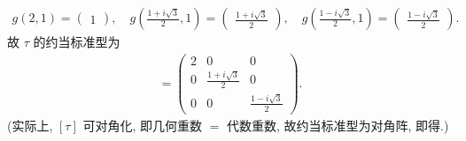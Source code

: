 \documentclass{assignment}
\begin{document}
\begin{sol}
\begin{itemize}
        \begin{align}
            g(2,1)=\begin{pmatrix}
                1
            \end{pmatrix},\quad g\left(\frac{1+i\sqrt{3}}{2},1\right)=\begin{pmatrix}
                \frac{1+i\sqrt{3}}{2}
            \end{pmatrix},\quad g\left(\frac{1-i\sqrt{3}}{2},1\right)=\begin{pmatrix}
                \frac{1-i\sqrt{3}}{2}
            \end{pmatrix}.
        \end{align}
        故 $\tau$ 的约当标准型为
        \begin{align}
            [\tau]=\begin{pmatrix}
                2&0&0\\
                0&\frac{1+i\sqrt{3}}{2}&0\\
                0&0&\frac{1-i\sqrt{3}}{2}
            \end{pmatrix}.
        \end{align}
        (实际上, $[\tau]$ 可对角化, 即几何重数 $=$ 代数重数, 故约当标准型为对角阵, 即得.)
    \end{itemize}
\end{sol}
\end{document}
